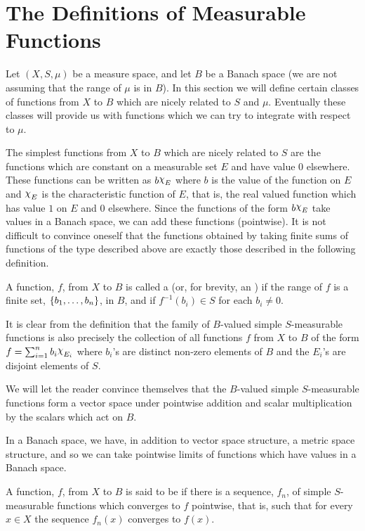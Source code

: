 
\section{The Definitions of Measurable Functions}

Let $(X, S, \mu)$ be a measure space, and let $B$ be a Banach space (we are not assuming that the range of $\mu$ is in $B$). In this section we will define certain classes of functions from $X$ to $B$ which are nicely related to $S$ and $\mu$. Eventually these classes will provide us with functions which we can try to integrate with respect to $\mu$.

The simplest functions from $X$ to $B$ which are nicely related to $S$ are the functions which are constant on a measurable set $E$ and have value 0 elsewhere. These functions can be written as $b\idf{E}$ where $b$ is the value of the function on $E$ and $\idf{E}$ is the characteristic function of $E$, that is, the real valued function which has value $1$ on $E$ and 0 elsewhere. Since the functions of the form $b\idf{E}$ take values in a Banach space, we can add these functions (pointwise). It is not difficult to convince oneself that the functions obtained by taking finite sums of functions of the type described above are exactly those described in the following definition.

\begin{definition}
A function, $f$, from $X$ to $B$ is called a  (or, for brevity, an ) if the range of $f$ is a finite set, $\left\{b_1,\dots,b_n\right\}$, in $B$, and if $f^{-1}(b_i)\in S$ for each $b_i\neq0$.
\end{definition}

It is clear from the definition that the family of $B$-valued simple $S$-measurable functions is also precisely the collection of all functions $f$ from $X$ to $B$ of the form $f=\sum_{i=1}^nb_i\idf{E_i}$ where $b_i$'s are distinct non-zero elements of $B$ and the $E_i$'s are disjoint elements of $S$.

We will let the reader convince themselves that the $B$-valued simple $S$-measurable functions form a vector space under pointwise addition and scalar multiplication by the scalars which act on $B$.

In a Banach space, we have, in addition to vector space structure, a metric space structure, and so we can take pointwise limits of functions which have values in a Banach space.

\begin{definition}
A function, $f$, from $X$ to $B$ is said to be  if there is a sequence, $f_n$, of simple $S$-measurable functions which converges to $f$ pointwise, that is, such that for every $x\in X$ the sequence $f_n(x)$ converges to $f(x)$.
\end{definition}

